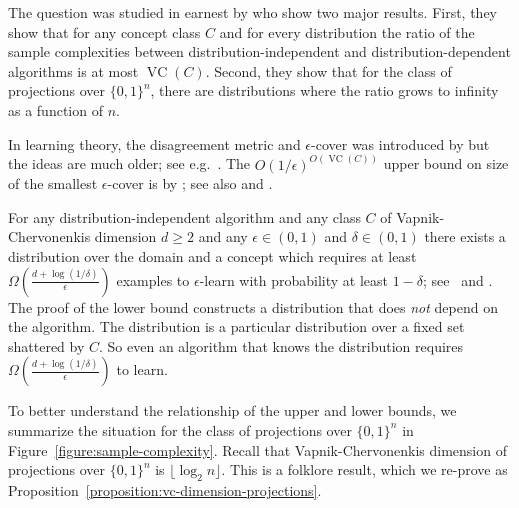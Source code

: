 \documentclass[10pt]{article}
\DeclareMathOperator{\VC}{VC}
\begin{document}
The question was studied in earnest by \cite{Darnstadt-Simon-Szorenyi-2013} who
show two major results. First, they show that for any concept class $C$ and for
every distribution the ratio of the sample complexities between
distribution-independent and distribution-dependent algorithms is at most
$\VC(C)$. Second, they show that for the class of projections over $\{0,1\}^n$,
there are distributions where the ratio grows to infinity as a function of $n$.

In learning theory, the disagreement metric and $\epsilon$-cover was  introduced
by \cite{Benedek-Itai-1991} but the ideas are much older; see
e.g.~\cite{Dudley-1978, Dudley-1984}. The $O(1/\epsilon)^{O(\VC(C))}$ upper
bound on size of the smallest $\epsilon$-cover is by \citet[Lemma
7.13]{Dudley-1978}; see also \citet[Chapter 4]{Devroye-Lugosi-2000} and
\cite{Haussler-1995}.

For any distribution-independent algorithm and any class $C$ of
Vapnik-Chervonenkis dimension $d \ge 2$ and any $\epsilon \in (0,1)$ and $\delta
\in (0,1)$ there exists a distribution over the domain and a concept which
requires at least $\Omega \left(\frac{d + \log(1/\delta)}{\epsilon}\right)$
examples to $\epsilon$-learn with probability at least $1 - \delta$;
see~\cite[Theorem 5.3]{Anthony-Bartlett-1999} and
\cite{Blumer-Ehrenfeucht-Haussler-Warmuth-1989,
Ehrenfeucht-Haussler-Kearns-Valiant-1989}. The proof of the lower bound
constructs a distribution that does \emph{not} depend on the algorithm. The
distribution is a particular distribution over a fixed set shattered by $C$. So
even an algorithm that knows the distribution requires $\Omega \left(\frac{d +
\log(1/\delta)}{\epsilon}\right)$ to learn.

To better understand the relationship of the upper and lower bounds, we
summarize the situation for the class of projections over $\{0,1\}^n$ in
Figure~\ref{figure:sample-complexity}. Recall that Vapnik-Chervonenkis dimension
of projections over $\{0,1\}^n$ is $\lfloor \log_2 n \rfloor$. This is a
folklore result, which we re-prove as
Proposition~\ref{proposition:vc-dimension-projections}.
\end{document}

